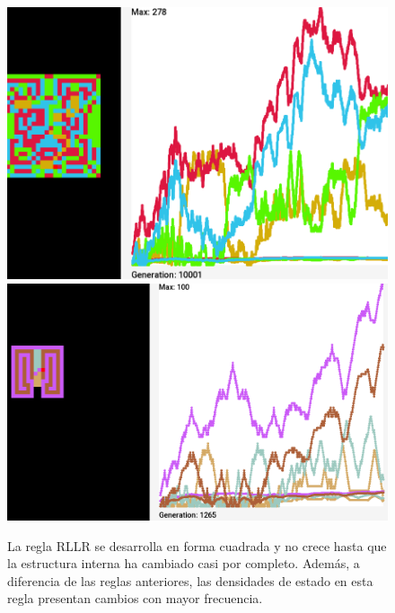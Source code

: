 \documentclass[12pt,twoside]{article}
\begin{document}
\begin{figure}[h!]
	\begin{minipage}{0.45\textwidth}
		\centering
		\includegraphics[width=\textwidth]{img/rllr1.png}
	\end{minipage}%
	\hspace{0.5cm}%
	\begin{minipage}{0.45\textwidth}
		\centering
		\includegraphics[width=\textwidth]{img/rllr2.png}
	\end{minipage}
	\vspace{0.3cm}
	
	\begin{minipage}{0.9\textwidth}
		\centering
		\small La regla RLLR se desarrolla en forma cuadrada y no crece hasta que la estructura interna ha cambiado casi por completo. Además, a diferencia de las reglas anteriores, las densidades de estado en esta regla presentan cambios con mayor frecuencia.
	\end{minipage}
	\vspace{0.5cm}
	

\end{figure}
\end{document}
